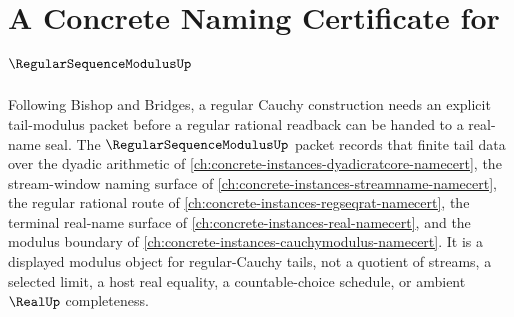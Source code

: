 \chapter{A Concrete Naming Certificate for $\RegularSequenceModulusUp$}
\label{ch:concrete-instances-regular-sequence-modulus-namecert}

Following Bishop and Bridges, a regular Cauchy construction needs an explicit tail-modulus packet before a regular rational readback can be handed to a real-name seal. The $\RegularSequenceModulusUp$ packet records that finite tail data over the dyadic arithmetic of \autoref{ch:concrete-instances-dyadicratcore-namecert}, the stream-window naming surface of \autoref{ch:concrete-instances-streamname-namecert}, the regular rational route of \autoref{ch:concrete-instances-regseqrat-namecert}, the terminal real-name surface of \autoref{ch:concrete-instances-real-namecert}, and the modulus boundary of \autoref{ch:concrete-instances-cauchymodulus-namecert}. It is a displayed modulus object for regular-Cauchy tails, not a quotient of streams, a selected limit, a host real equality, a countable-choice schedule, or ambient $\RealUp$ completeness.

